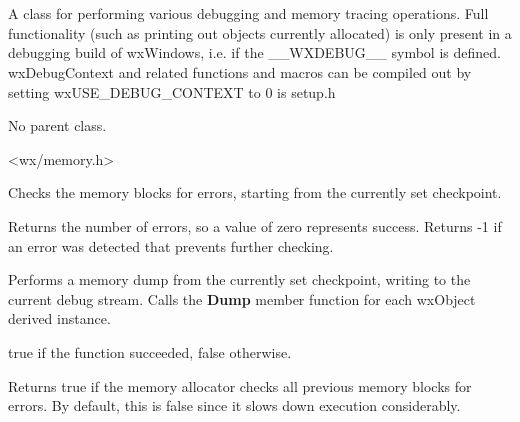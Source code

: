 \section{}\label{wxdebugcontext}

A class for performing various debugging and memory tracing
operations. Full functionality (such as printing out objects
currently allocated) is only present in a debugging build of wxWindows,
i.e. if the \_\_WXDEBUG\_\_ symbol is defined. wxDebugContext
and related functions and macros can be compiled out by setting
wxUSE\_DEBUG\_CONTEXT to 0 is setup.h


No parent class.


<wx/memory.h>




\label{wxdebugcontextcheck}


Checks the memory blocks for errors, starting from the currently set
checkpoint.


Returns the number of errors,
so a value of zero represents success. Returns -1 if an error
was detected that prevents further checking.

\label{wxdebugcontextdump}


Performs a memory dump from the currently set checkpoint, writing to the
current debug stream. Calls the {\bf Dump} member function for each wxObject
derived instance.


true if the function succeeded, false otherwise.

\label{wxdebugcontextgetcheckprevious}


Returns true if the memory allocator checks all previous memory blocks for errors.
By default, this is false since it slows down execution considerably.

